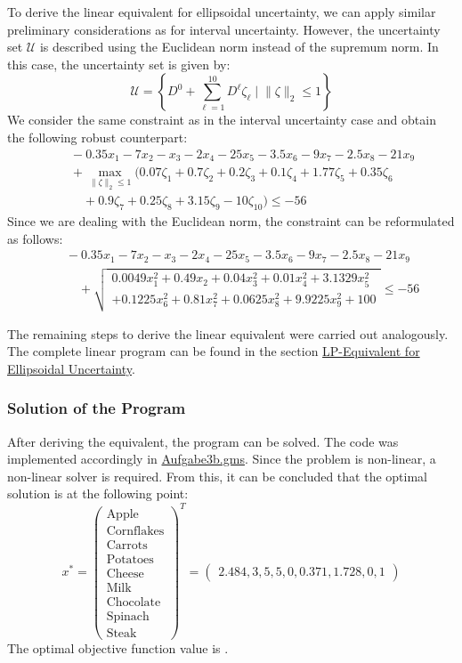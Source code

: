 \documentclass[a4paper,12pt]{article}
\begin{document}
To derive the linear equivalent for ellipsoidal uncertainty, we can apply similar preliminary considerations as for interval uncertainty. However, the uncertainty set $\mathcal{U}$ is described using the Euclidean norm instead of the supremum norm. In this case, the uncertainty set is given by:
\[
\mathcal{U} = \left\{ D^0 + \sum_{\ell=1}^{10}D^{\ell} \zeta_{\ell} \;\vert\; \|\zeta\|_2 \leq 1 \right\}
\]
We consider the same constraint as in the interval uncertainty case and obtain the following robust counterpart:
\[
\begin{aligned}
    &\quad -0.35x_1 - 7x_2 - x_3 - 2x_4 - 25x_5 - 3.5x_6 - 9x_7 - 2.5x_8 - 21x_9 \\
    &\quad + \max_{\|\zeta\|_2 \leq 1} \big( 0.07\zeta_1 + 0.7\zeta_2 + 0.2\zeta_3 + 0.1\zeta_4 + 1.77\zeta_5 +  0.35\zeta_6\\
    &\qquad + 0.9\zeta_7 + 0.25\zeta_8 + 3.15\zeta_9 - 10\zeta_{10} \big) \leq -56
\end{aligned}
\]
Since we are dealing with the Euclidean norm, the constraint can be reformulated as follows:
\[
\begin{aligned}
    &\quad -0.35x_1 - 7x_2 - x_3 - 2x_4 - 25x_5 - 3.5x_6 - 9x_7 - 2.5x_8 - 21x_9 \\
    &\qquad + \sqrt{
        \begin{aligned}0.0049x_1^2 + 0.49x_2 + 0.04x_3^2 + 0.01x_4^2 + 3.1329x_5^2 \\
            + 0.1225x_6^2 + 0.81x_7^2 + 0.0625x_8^2 + 9.9225x_9^2 + 100 \end{aligned}
            } \leq -56
\end{aligned}
\]

The remaining steps to derive the linear equivalent were carried out analogously. The complete linear program can be found in the section \hyperref[sec:lp-equivalent-ellips]{LP-Equivalent for Ellipsoidal Uncertainty}.

\subsubsection*{Solution of the Program}

After deriving the equivalent, the program can be solved. The code was implemented accordingly in \href{../src/r3/Aufgabe3b.gms}{Aufgabe3b.gms}. Since the problem is non-linear, a non-linear solver is required.
From this, it can be concluded that the optimal solution is at the following point:
\[
x^* = \begin{pmatrix}
    \text{Apple} \\ \text{Cornflakes} \\ \text{Carrots} \\ \text{Potatoes} \\ \text{Cheese} \\ \text{Milk} \\ \text{Chocolate} \\ \text{Spinach} \\ \text{Steak}
    \end{pmatrix}^T
     =
     \begin{pmatrix}
        2.484, 3, 5, 5, 0, 0.371, 1.728, 0, 1
        \end{pmatrix}
\]
The optimal objective function value is .
\end{document}
